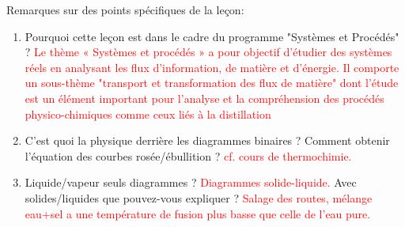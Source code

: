 \begin{reportBlock}{Remarques sur des points spécifiques de la leçon: }
\begin{enumerate}
    \item Pourquoi cette leçon est dans le cadre du programme "Systèmes et Procédés" ? \textcolor{red}{Le thème « Systèmes et procédés » a pour objectif d’étudier des systèmes réels en analysant les flux d’information, de matière et d’énergie. Il comporte un sous-thème "transport et transformation des flux de matière" dont l'étude est un élément important pour l’analyse et la compréhension des procédés physico-chimiques comme ceux liés à la distillation}
    \item C’est quoi la physique derrière les diagrammes binaires ? Comment obtenir l’équation des courbes rosée/ébullition ? \textcolor{red}{cf. cours de thermochimie.}
    \item Liquide/vapeur seuls diagrammes ? \textcolor{red}{Diagrammes solide-liquide.} Avec solides/liquides que pouvez-vous expliquer ? \textcolor{red}{Salage des routes, mélange eau+sel a une température de fusion plus basse que celle de l'eau pure.} 
    
    \end{enumerate}

\end{reportBlock}

